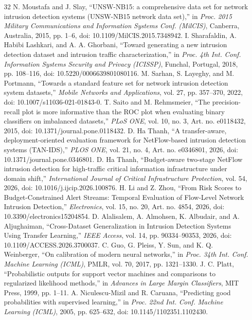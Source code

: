 \documentclass[conference]{IEEEtran}
\begin{document}
\begin{thebibliography}{32}
N. Moustafa and J. Slay, ``UNSW-NB15: a comprehensive data set for network intrusion detection systems (UNSW-NB15 network data set),'' in \emph{Proc. 2015 Military Communications and Information Systems Conf. (MilCIS)}, Canberra, Australia, 2015, pp. 1--6, doi: 10.1109/MilCIS.2015.7348942.
I. Sharafaldin, A. Habibi Lashkari, and A. A. Ghorbani, ``Toward generating a new intrusion detection dataset and intrusion traffic characterization,'' in \emph{Proc. 4th Int. Conf. Information Systems Security and Privacy (ICISSP)}, Funchal, Portugal, 2018, pp. 108--116, doi: 10.5220/0006639801080116.
M. Sarhan, S. Layeghy, and M. Portmann, ``Towards a standard feature set for network intrusion detection system datasets,'' \emph{Mobile Networks and Applications}, vol. 27, pp. 357--370, 2022, doi: 10.1007/s11036-021-01843-0.
T. Saito and M. Rehmsmeier, ``The precision-recall plot is more informative than the ROC plot when evaluating binary classifiers on imbalanced datasets,'' \emph{PLoS ONE}, vol. 10, no. 3, Art. no. e0118432, 2015, doi: 10.1371/journal.pone.0118432.
D. Ha Thanh, ``A transfer-aware, deployment-oriented evaluation framework for NetFlow-based intrusion detection systems (TAN-IDS),'' \emph{PLOS ONE}, vol. 21, no. 4, Art. no. e0346801, 2026, doi: 10.1371/journal.pone.0346801.
D. Ha Thanh, ``Budget-aware two-stage NetFlow intrusion detection for high-traffic critical information infrastructure under domain shift,'' \emph{International Journal of Critical Infrastructure Protection}, vol. 54, 2026, doi: 10.1016/j.ijcip.2026.100876.
H. Li and Z. Zhou, ``From Risk Scores to Budget-Constrained Alert Streams: Temporal Evaluation of Flow-Level Network Intrusion Detection,'' \emph{Electronics}, vol. 15, no. 20, Art. no. 4854, 2026, doi: 10.3390/electronics15204854.
D. Alalisalem, A. Almohsen, K. Albudair, and A. Aljughaiman, ``Cross-Dataset Generalization in Intrusion Detection Systems Using Transfer Learning,'' \emph{IEEE Access}, vol. 14, pp. 90334--90353, 2026, doi: 10.1109/ACCESS.2026.3700037.
C. Guo, G. Pleiss, Y. Sun, and K. Q. Weinberger, ``On calibration of modern neural networks,'' in \emph{Proc. 34th Int. Conf. Machine Learning (ICML)}, PMLR, vol. 70, 2017, pp. 1321--1330.
J. C. Platt, ``Probabilistic outputs for support vector machines and comparisons to regularized likelihood methods,'' in \emph{Advances in Large Margin Classifiers}, MIT Press, 1999, pp. 1--11.
A. Niculescu-Mizil and R. Caruana, ``Predicting good probabilities with supervised learning,'' in \emph{Proc. 22nd Int. Conf. Machine Learning (ICML)}, 2005, pp. 625--632, doi: 10.1145/1102351.1102430.

\end{thebibliography}
\end{document}
